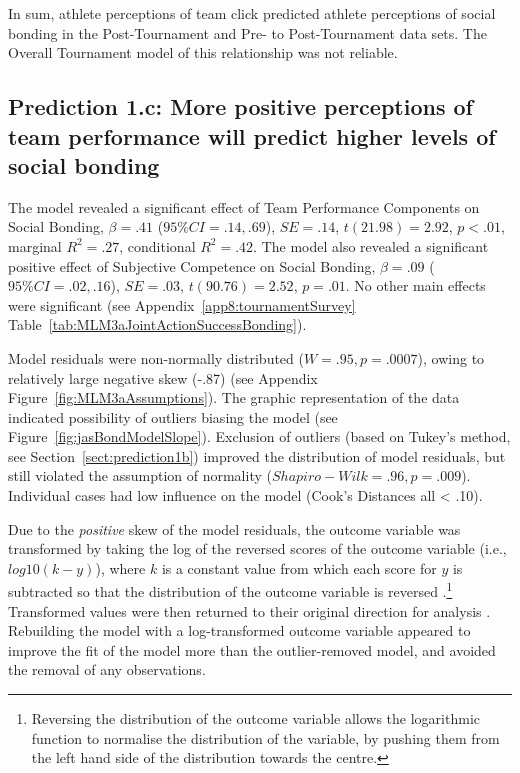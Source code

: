 \begin{CJK}{UTF8}{gbsn}


In sum, athlete perceptions of team click predicted athlete perceptions of social bonding in the Post-Tournament and Pre- to Post-Tournament data sets.  The Overall Tournament model of this relationship was not reliable.








\subsection{Prediction 1.c: More positive perceptions of team performance will predict higher levels of social bonding}


The model revealed a significant effect of Team Performance Components on Social Bonding, $\beta = .41$ ($95\% CI =  .14, .69$), $SE = .14$, $t(21.98) = 2.92$, $p < .01$, marginal $R^2 = .27$, conditional $R^2 = .42$.  The model also revealed a significant positive effect of Subjective Competence on Social Bonding, $\beta = .09$ ($95\% CI =  .02, .16$), $SE = .03$, $t(90.76) = 2.52$, $p = .01$. No other main effects were significant (see Appendix~\ref{app8:tournamentSurvey} Table~\ref{tab:MLM3aJointActionSuccessBonding}).



Model residuals were non-normally distributed ($W = .95, p = .0007$), owing to relatively large negative skew (-.87) (see Appendix Figure~\ref{fig:MLM3aAssumptions}).  The graphic representation of the data indicated possibility of outliers biasing the model (see Figure~\ref{fig:jasBondModelSlope}).
Exclusion of outliers (based on Tukey's method, see Section~\ref{sect:prediction1b}) improved the distribution of model residuals, but still violated the assumption of normality ($Shapiro-Wilk = .96, p = .009$).  Individual cases had low influence on the model (Cook's Distances all < .10).

Due to the \textit{positive} skew of the model residuals, the outcome variable was transformed by taking the log of the reversed scores of the outcome variable (i.e., $log10(k - y)$), where $k$ is a constant value from which each score for $y$ is subtracted so that the distribution of the outcome variable is reversed \citep{Howell2012}.\footnote{Reversing the distribution of the outcome variable allows the logarithmic function to normalise the distribution of the variable, by pushing them from the left hand side of the distribution towards the centre.}
Transformed values were then returned to their original direction for analysis \citep{Field2012}.  Rebuilding the model with a log-transformed outcome variable appeared to improve the fit of the model more than the outlier-removed model, and avoided the removal of any observations.


\end{CJK}

